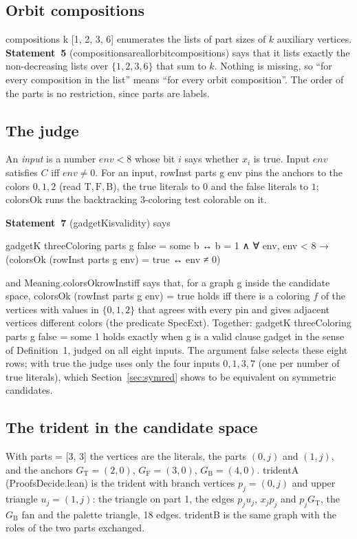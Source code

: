 \documentclass[11pt,a4paper]{article}
\newcommand{\leanus}{\textunderscore\allowbreak}
\newcommand{\lean}[1]{{\ttfamily\let\_\leanus #1}}
\newcommand{\GT}{G_{\mathrm{T}}}
\newcommand{\GF}{G_{\mathrm{F}}}
\newcommand{\GB}{G_{\mathrm{B}}}
\newcommand{\T}{\mathrm{T}}
\newcommand{\F}{\mathrm{F}}
\newcommand{\B}{\mathrm{B}}
\theoremstyle{definition}
\begin{document}
\subsection{Orbit compositions}\label{sec:comp}
\lean{compositions k [1, 2, 3, 6]} enumerates the lists of part sizes of $k$
auxiliary vertices. \textbf{Statement~5} (\lean{compositions\_are\_all\_orbit\_compositions})
says that it lists exactly the non-decreasing lists over $\{1,2,3,6\}$ that
sum to $k$. Nothing is missing, so ``for every composition in the list''
means ``for every orbit composition''. The order of the parts is no
restriction, since parts are labels.

\subsection{The judge}\label{sec:judge}
An \emph{input} is a number $\mathit{env}<8$ whose bit $i$ says whether
$x_i$ is true. Input $\mathit{env}$ satisfies $C$ iff $\mathit{env}\neq 0$.
For an input, \lean{rowInst parts g env} pins the anchors to the colors
$0,1,2$ (read $\T,\F,\B$), the true literals to $0$ and the false literals to
$1$; \lean{colorsOk} runs the backtracking 3-coloring test \lean{colorable}
on it.

\textbf{Statement~7} (\lean{gadgetK\_is\_validity}) says
\begin{code}
gadgetK threeColoring parts g false = some b ↔
  b = 1 ∧ ∀ env, env < 8 → (colorsOk (rowInst parts g env) = true ↔ env ≠ 0)
\end{code}
and \lean{Meaning.colorsOk\_rowInst\_iff} says that, for a graph \lean{g}
inside the candidate space,
\lean{colorsOk (rowInst parts g env) = true} holds iff there is a coloring
$f$ of the vertices with values in $\{0,1,2\}$ that agrees with every pin and
gives adjacent vertices different colors (the predicate \lean{SpecExt}).
Together: \lean{gadgetK threeColoring parts g false = some 1} holds exactly
when \lean{g} is a valid clause gadget in the sense of Definition~1, judged
on all eight inputs. The argument \lean{false} selects these eight rows;
with \lean{true} the judge uses only the four inputs $0,1,3,7$ (one per
number of true literals), which Section~\ref{sec:symred} shows to be
equivalent on symmetric candidates.

\subsection{The trident in the candidate space}
With \lean{parts = [3, 3]} the vertices are the literals, the parts
$(0,j)$ and $(1,j)$, and the anchors $\GT=(2,0)$, $\GF=(3,0)$, $\GB=(4,0)$.
\lean{tridentA} (\lean{ProofsDecide.lean}) is the trident with branch
vertices $p_j=(0,j)$ and upper triangle $u_j=(1,j)$: the triangle on part 1,
the edges $p_j u_j$, $x_j p_j$ and $p_j\GT$, the $\GB$ fan and the palette
triangle, 18 edges. \lean{tridentB} is the same graph with the roles of the
two parts exchanged.
\end{document}
